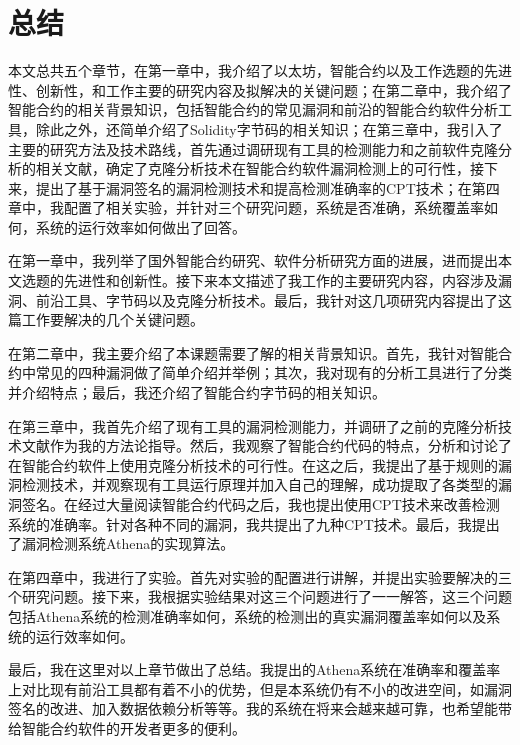 \chapter{总结}

本文总共五个章节，在第一章中，我介绍了以太坊，智能合约以及工作选题的先进性、创新性，和工作主要的研究内容及拟解决的关键问题；在第二章中，我介绍了智能合约的相关背景知识，包括智能合约的常见漏洞和前沿的智能合约软件分析工具，除此之外，还简单介绍了Solidity字节码的相关知识；在第三章中，我引入了主要的研究方法及技术路线，首先通过调研现有工具的检测能力和之前软件克隆分析的相关文献，确定了克隆分析技术在智能合约软件漏洞检测上的可行性，接下来，提出了基于漏洞签名的漏洞检测技术和提高检测准确率的CPT技术；在第四章中，我配置了相关实验，并针对三个研究问题，系统是否准确，系统覆盖率如何，系统的运行效率如何做出了回答。

在第一章中，我列举了国外智能合约研究、软件分析研究方面的进展，进而提出本文选题的先进性和创新性。接下来本文描述了我工作的主要研究内容，内容涉及漏洞、前沿工具、字节码以及克隆分析技术。最后，我针对这几项研究内容提出了这篇工作要解决的几个关键问题。

在第二章中，我主要介绍了本课题需要了解的相关背景知识。首先，我针对智能合约中常见的四种漏洞做了简单介绍并举例；其次，我对现有的分析工具进行了分类并介绍特点；最后，我还介绍了智能合约字节码的相关知识。

在第三章中，我首先介绍了现有工具的漏洞检测能力，并调研了之前的克隆分析技术文献作为我的方法论指导。然后，我观察了智能合约代码的特点，分析和讨论了在智能合约软件上使用克隆分析技术的可行性。在这之后，我提出了基于规则的漏洞检测技术，并观察现有工具运行原理并加入自己的理解，成功提取了各类型的漏洞签名。在经过大量阅读智能合约代码之后，我也提出使用CPT技术来改善检测系统的准确率。针对各种不同的漏洞，我共提出了九种CPT技术。最后，我提出了漏洞检测系统Athena的实现算法。

在第四章中，我进行了实验。首先对实验的配置进行讲解，并提出实验要解决的三个研究问题。接下来，我根据实验结果对这三个问题进行了一一解答，这三个问题包括Athena系统的检测准确率如何，系统的检测出的真实漏洞覆盖率如何以及系统的运行效率如何。

最后，我在这里对以上章节做出了总结。我提出的Athena系统在准确率和覆盖率上对比现有前沿工具都有着不小的优势，但是本系统仍有不小的改进空间，如漏洞签名的改进、加入数据依赖分析等等。我的系统在将来会越来越可靠，也希望能带给智能合约软件的开发者更多的便利。
